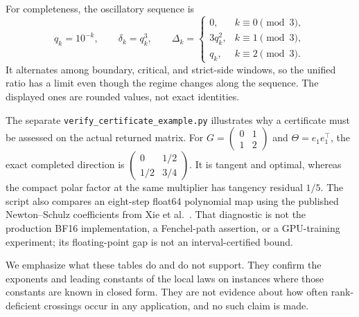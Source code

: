 For completeness, the oscillatory sequence is
\[ q_k=10^{-k},\qquad \delta_k=q_k^3,\qquad
\Delta_k=\begin{cases}
0,& k\equiv0\pmod3,\\
3q_k^2,& k\equiv1\pmod3,\\
q_k,& k\equiv2\pmod3.
\end{cases} \]
It alternates among boundary, critical, and strict-side windows, so the
unified ratio has a limit even though the regime changes along the sequence.
The displayed ones are rounded values, not exact identities.


The separate \texttt{verify\_certificate\_example.py} illustrates why a
certificate must be assessed on the actual returned matrix.  For
\(G=\left(\begin{smallmatrix}0&1\\1&2\end{smallmatrix}\right)\) and
\(\Theta=e_1e_1^\top\), the exact completed direction is
\(\left(\begin{smallmatrix}0&1/2\\1/2&3/4\end{smallmatrix}\right)\).
It is tangent and optimal, whereas the compact polar factor at the same
multiplier has tangency residual \(1/5\).  The script also compares an
eight-step float64 polynomial map using the published Newton--Schulz
coefficients from Xie et al.~\cite{xie2026controlled}.  That diagnostic is not the production BF16 implementation,
a Fenchel-path assertion, or a GPU-training experiment; its floating-point
gap is not an interval-certified bound.

We emphasize what these tables do and do not support.  They confirm the
exponents and leading constants of the local laws on instances where those
constants are known in closed form.  They are not evidence about how often
rank-deficient crossings occur in any application, and no such claim is made.
